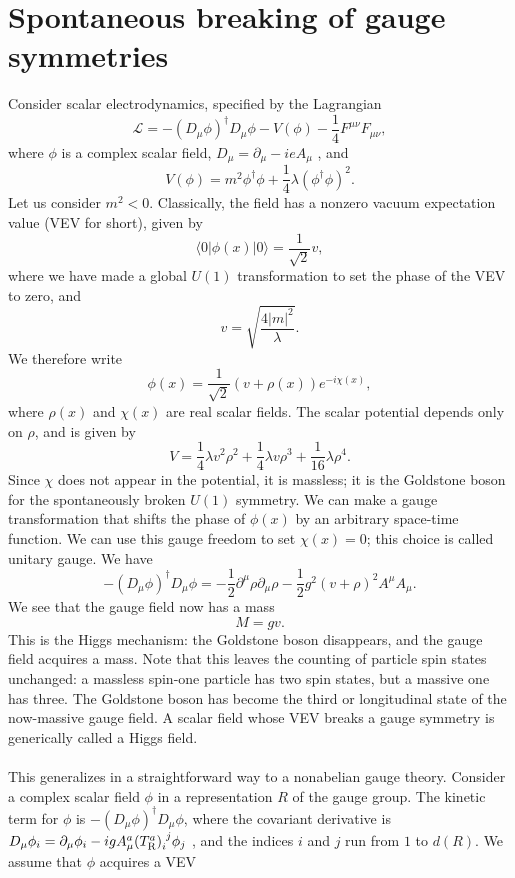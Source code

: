 \section{Spontaneous breaking of gauge symmetries}
Consider scalar electrodynamics, specified by the Lagrangian
\[\mathcal{L} = -(D_{\mu}\phi)^{\dagger}D_{\mu}\phi - V(\phi) - \frac{1}{4}F^{\mu\nu}F_{\mu\nu},\]
where $\phi$ is a complex scalar field, $D_{\mu} = \partial_{\mu} - ieA_{\mu}$ , and
\[V(\phi) = m^2\phi^{\dagger}\phi + \frac{1}{4}\lambda (\phi^{\dagger}\phi)^2.\]
Let us consider $m^2 < 0$. Classically, the field has a nonzero vacuum expectation value (VEV for short), given by
\[\langle 0 | \phi(x) | 0 \rangle = \frac{1}{\sqrt{2}}v,\]
where we have made a global $U(1)$ transformation to set the phase of the VEV to zero, and
\[v = \sqrt{\frac{4|m|^2}{\lambda}}.\]
We therefore write
\[\phi(x) = \frac{1}{\sqrt{2}} (v + \rho(x)) e^{-i\chi(x)},\]
where $\rho(x)$ and $\chi(x)$ are real scalar fields. The scalar potential depends only on $\rho$, and is given by
\[V = \frac{1}{4}\lambda v^2\rho^2 + \frac{1}{4}\lambda v \rho^3 + \frac{1}{16}\lambda \rho^4.\]
Since $\chi$ does not appear in the potential, it is massless; it is the Goldstone boson for the spontaneously broken $U(1)$ symmetry.
We can make a gauge transformation that shifts the phase of $\phi(x)$ by an arbitrary space-time function.
We can use this gauge freedom to set $\chi(x) = 0$; this choice is called unitary gauge.
We have
\[-(D_{\mu}\phi)^{\dagger}D_{\mu}\phi = -\frac{1}{2}\partial^{\mu}\rho \partial_{\mu}\rho - \frac{1}{2}g^2(v+\rho)^2 A^{\mu}A_{\mu}.\]
We see that the gauge field now has a mass
\[M = gv.\]
This is the Higgs mechanism: the Goldstone boson disappears, and the gauge field acquires a mass. Note that this leaves the counting of particle spin states unchanged: a massless spin-one particle has two spin states, but a massive
one has three. The Goldstone boson has become the third or longitudinal state of the now-massive gauge field. A scalar field whose VEV breaks a gauge symmetry is generically called a Higgs field.
\\ \\
This generalizes in a straightforward way to a nonabelian gauge theory. Consider a complex scalar field $\phi$ in a representation $R$ of the gauge group.
The kinetic term for $\phi$ is $-(D_{\mu}\phi)^{\dagger}D_{\mu}\phi$, where the covariant derivative is $D_{\mu}\phi_i = \partial_{\mu}\phi_i - igA^a_{\mu}(T^a_{\rm R})_{i}^{\phantom{i}j} \phi_j$ , and the indices $i$ and $j$ run from $1$ to $d(R)$.
We assume that $\phi$ acquires a VEV
